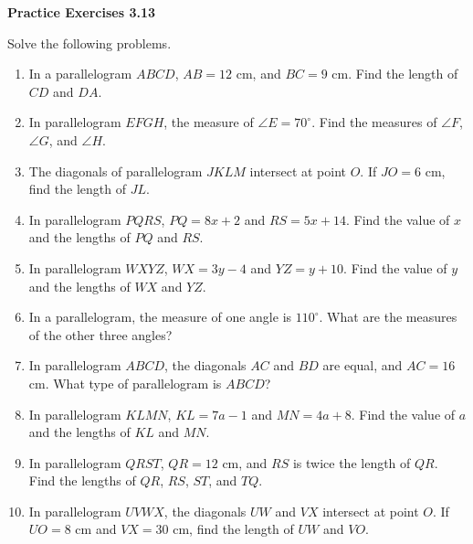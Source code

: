 \vspace{0.3ex}
\noindent\textbf{Practice Exercises 3.13}

\vspace{0.2ex}

Solve the following problems.

\begin{enumerate}
    \item In a parallelogram \(ABCD\), \(AB = 12\) cm, and \(BC = 9\) cm. Find the length of \(CD\) and \(DA\).
    \item In parallelogram \(EFGH\), the measure of \(\angle E = 70^\circ\). Find the measures of \(\angle F\), \(\angle G\), and \(\angle H\).
    \item The diagonals of parallelogram \(JKLM\) intersect at point \(O\). If \(JO = 6\) cm, find the length of \(JL\).
    \item In parallelogram \(PQRS\), \(PQ = 8x + 2\) and \(RS = 5x + 14\). Find the value of \(x\) and the lengths of \(PQ\) and \(RS\).
    \item In parallelogram \(WXYZ\), \(WX = 3y - 4\) and \(YZ = y + 10\). Find the value of \(y\) and the lengths of \(WX\) and \(YZ\).
    \item In a parallelogram, the measure of one angle is \(110^\circ\). What are the measures of the other three angles?
    \item In parallelogram \(ABCD\), the diagonals \(AC\) and \(BD\) are equal, and \(AC = 16\) cm. What type of parallelogram is \(ABCD\)?
    \item In parallelogram \(KLMN\), \(KL = 7a - 1\) and \(MN = 4a + 8\). Find the value of \(a\) and the lengths of \(KL\) and \(MN\).
    \item In parallelogram \(QRST\), \(QR = 12\) cm, and \(RS\) is twice the length of \(QR\). Find the lengths of \(QR\), \(RS\), \(ST\), and \(TQ\).
    \item In parallelogram \(UVWX\), the diagonals \(UW\) and \(VX\) intersect at point \(O\). If \(UO = 8\) cm and \(VX = 30\) cm, find the length of \(UW\) and \(VO\).
\end{enumerate}
